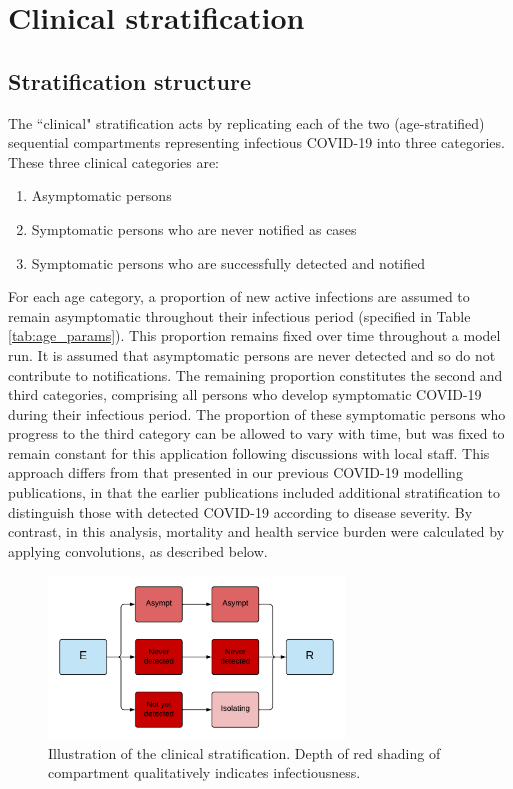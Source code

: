 \section{Clinical stratification} \label{clin}
\subsection{Stratification structure}
The ``clinical" stratification acts by replicating 
each of the two (age-stratified) sequential compartments representing infectious COVID-19 
into three categories.
These three clinical categories are:
\begin{enumerate}
    \item Asymptomatic persons
    \item Symptomatic persons who are never notified as cases
    \item Symptomatic persons who are successfully detected and notified
\end{enumerate}
For each age category, a proportion of new active infections are assumed to remain asymptomatic 
throughout their infectious period (specified in Table \ref{tab:age_params}).
This proportion remains fixed over time throughout a model run.
It is assumed that asymptomatic persons are never detected 
and so do not contribute to notifications.
The remaining proportion constitutes the second and third categories, 
comprising all persons who develop symptomatic COVID-19 during their infectious period.
The proportion of these symptomatic persons who progress to the third category 
can be allowed to vary with time,
but was fixed to remain constant for this application following discussions with local staff.
This approach differs from that presented in our previous COVID-19 modelling publications,
in that the earlier publications included additional stratification 
to distinguish those with detected COVID-19 according to disease severity.
By contrast, in this analysis, mortality and health service burden were calculated
by applying convolutions, as described below.
\begin{figure}[ht]
    \begin{center}
    \includegraphics[width=0.7\textwidth]{../../tex_descriptions/models/sm_sir/stratifications/clinical_strat.pdf}
    \end{center}
    \caption{Illustration of the clinical stratification. \small Depth of red shading of compartment qualitatively indicates infectiousness.}
    \label{fig:seeiir}
\end{figure}
